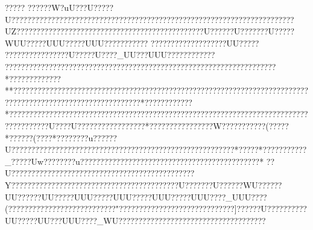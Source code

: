 {{{{{{{{{{{{{{{{{{{{{{{{{{{{{{{{{{{{{{{{{{{{{{{{{{{{{{{{{{{{{{{{{{{{{{{{{{{{{{{{{{{{{{{{{{{{{{{{{{{{{{{{{{{{{{{{{{{{{{{{{{{{{{{{{{{{{{{{{{{{{{{{{{{{{{{{{{{{{{{{{{{{{{{{{{{{{{{{{{{{{{{{{{{{{{{{{{{{{{{{{{{{{{{{{{{{{{{{{{{{{{{{{{{{{{{{{{{{{{{{{{{{{{{{{{{{{{{{{{{{{{{{{{{{{{{{{{{{{{{{{{{{{{{{{{{{{{{{{{{{{{{{{{{{{{{{{{{{{{{{{{{{{{{{{{{{{{{{{{{{{{{{{{{{{{{{{{{{{{{{{{{{{{{{{{{{{{{{{{{{{{{{{{{{{{{{{{{{{{{{{{{{{{{{{{{{{{{{{{{{{{{{{{{{{{{{{{{{{{{{{{{{{{{{{{{{{{{{{{{{{{{{{{{{{{{{{{{{{{{{{{{{{{{{{{{{{{{{{{{{{{{{{{{{{{{{{{{{{{{{{{{{{{{{{{{{{{{{{{{{{{{{{{{{{{{{{{{{{{{{{{{{{{{{{{{{{{{{{{{{{{{{{{{{{{{{{{{{{{{{{{{{{{{{{{{{{{{{{{{{{{{{{{{{{{{{{{{{{{{{{{{{{{{{{{{{{{{{{{{{{{{{{{{{{{{{{{{{{{{{{{{{{{{{{{{{{{{{{{{{{{{{{{{{{{{{{{{{{{{{{{{{{{{{{{{{{{{{{{{{{{{{{{{{{{{{{{{{{{{{{{{{{{{{{{{{{{{{{{{{{{{{{{{{{{{{????? ??????W?uU???U}?????U?????????????????????????  ??????  ??????  ?????? ??????? ??????? ??????? ???????UZ?????? ??????? ??????????????????????????????????U??????U???????U?????WUU?????UUU?????UUU??????  ?????  ????? ????  ????? ?????UU????? ????????????????U?????U????_UU???UUU??  ???? ?????? ????????????????????????????????????????????????????????????????????*?????????????**?????????????? ??????????????????????????????????????????????????????????????????????????????????????????????*????????????*??????????????????????????????????????????????????????????????????????????????????????U????U?????????????????*????????????????W???????????(?????*??????( ????*????????u??????U????????????????????????????????????????????????????????*?????*???????????_?????Uw????????u?????????????????????????????????????????????*
??U??????????????????????????????????? ???????????Y??????????????????????????????????   ????????U???????U??????WU??????UU??????UU?????UUU?????UUU?????UUU?????UUU????_UUU????   (????   ?????  ??????  ??????  ?????? "?????????????????????????????]??????U?????  ?????UU?????UU???UUU????_WU??   ???  ???? ????????????????????????????
}}}}}}}}}}}}}}}}}}}}}}}}}}}}}}}}}}}}}}}}}}}}}}}}}}}}}}}}}}}}}}}}}}}}}}}}}}}}}}}}}}}}}}}}}}}}}}}}}}}}}}}}}}}}}}}}}}}}}}}}}}}}}}}}}}}}}}}}}}}}}}}}}}}}}}}}}}}}}}}}}}}}}}}}}}}}}}}}}}}}}}}}}}}}}}}}}}}}}}}}}}}}}}}}}}}}}}}}}}}}}}}}}}}}}}}}}}}}}}}}}}}}}}}}}}}}}}}}}}}}}}}}}}}}}}}}}}}}}}}}}}}}}}}}}}}}}}}}}}}}}}}}}}}}}}}}}}}}}}}}}}}}}}}}}}}}}}}}}}}}}}}}}}}}}}}}}}}}}}}}}}}}}}}}}}}}}}}}}}}}}}}}}}}}}}}}}}}}}}}}}}}}}}}}}}}}}}}}}}}}}}}}}}}}}}}}}}}}}}}}}}}}}}}}}}}}}}}}}}}}}}}}}}}}}}}}}}}}}}}}}}}}}}}}}}}}}}}}}}}}}}}}}}}}}}}}}}}}}}}}}}}}}}}}}}}}}}}}}}}}}}}}}}}}}}}}}}}}}}}}}}}}}}}}}}}}}}}}}}}}}}}}}}}}}}}}}}}}}}}}}}}}}}}}}}}}}}}}}}}}}}}}}}}}}}}}}}}}}}}}}}}}}}}}}}}}}}}}}}}}}}}}}}}}}}}}}}}}}}}}}}}}}}}}}}}}}}}}}}}}}}}}}}}}}}}}}}}}}}}}}}}}}}}}}}}}}}}}}}}}}}}}}}}}}}}}}}}}}}}}}}}}}}}}}}}}}}}}}}}}}}}}}}}}}}}
